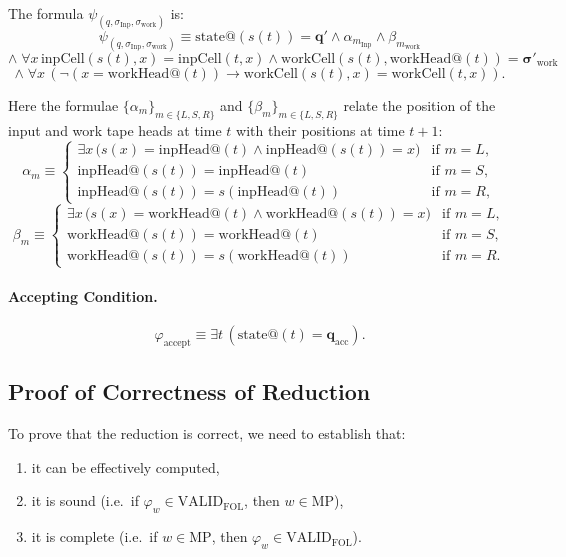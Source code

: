 \documentclass{article}
\begin{document}
The formula $\psi_{(q,\sigma_{\mathrm{Inp}},\sigma_{\mathrm{work}})}$ is:
\[
\psi_{(q,\sigma_{\mathrm{Inp}},\sigma_{\mathrm{work}})} \equiv
\mathrm{state@}(s(t))=\mathbf{q'}
\land
\alpha_{m_{\mathrm{Inp}}}
\land
\beta_{m_{\mathrm{work}}}
\]
\[
\land\;
\forall x\, \mathrm{inpCell}(s(t),x)=\mathrm{inpCell}(t,x)
\land
\mathrm{workCell}(s(t),\mathrm{workHead@}(t))=\boldsymbol{\sigma'_{\mathrm{work}}}
\]
\[
\land\;
\forall x\,
\left(
\neg(x=\mathrm{workHead@}(t))
\to
\mathrm{workCell}(s(t),x)=\mathrm{workCell}(t,x)
\right).
\]

Here the formulae $\{\alpha_m\}_{m\in \{L,S,R\}}$ and $\{\beta_m\}_{m\in \{L,S,R\}}$ relate the position of the input and work tape heads at time $t$ with their positions at time $t+1$:
\[
\alpha_m \equiv
\begin{cases}
\exists x\, \bigl(s(x)=\mathrm{inpHead@}(t)\land \mathrm{inpHead@}(s(t))=x\bigr) & \text{if } m=L,\\[4pt]
\mathrm{inpHead@}(s(t))=\mathrm{inpHead@}(t) & \text{if } m=S,\\[4pt]
\mathrm{inpHead@}(s(t))=s(\mathrm{inpHead@}(t)) & \text{if } m=R,
\end{cases}
\]
\[
\beta_m \equiv
\begin{cases}
\exists x\, \bigl(s(x)=\mathrm{workHead@}(t)\land \mathrm{workHead@}(s(t))=x\bigr) & \text{if } m=L,\\[4pt]
\mathrm{workHead@}(s(t))=\mathrm{workHead@}(t) & \text{if } m=S,\\[4pt]
\mathrm{workHead@}(s(t))=s(\mathrm{workHead@}(t)) & \text{if } m=R.
\end{cases}
\]

\paragraph{Accepting Condition.}
\[
\varphi_{\mathrm{accept}} \equiv \exists t\, (\mathrm{state@}(t)=\mathbf{q_{\mathrm{acc}}}).
\]

\subsection*{Proof of Correctness of Reduction}

To prove that the reduction is correct, we need to establish that:
\begin{enumerate}
    \item it can be effectively computed,
    \item it is sound (i.e.\ if $\varphi_w \in \mathrm{VALID}_{\mathrm{FOL}}$, then $w\in \mathrm{MP}$),
    \item it is complete (i.e.\ if $w\in \mathrm{MP}$, then $\varphi_w \in \mathrm{VALID}_{\mathrm{FOL}}$).
\end{enumerate}
\end{document}
